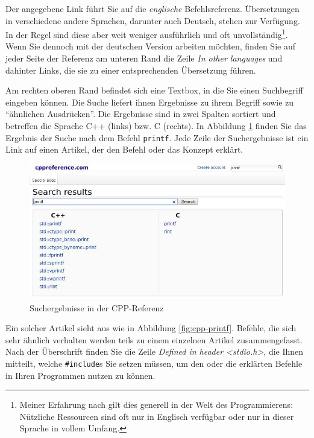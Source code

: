 Der angegebene Link führt Sie auf die \emph{englische} Befehlsreferenz. Übersetzungen in verschiedene andere Sprachen, darunter auch Deutsch, stehen zur Verfügung. In der Regel sind diese aber weit weniger ausführlich und oft unvollständig\footnote{Meiner Erfahrung nach gilt dies generell in der Welt des Programmierens: Nützliche Ressourcen sind oft nur in Englisch verfügbar oder nur in dieser Sprache in vollem Umfang.}. Wenn Sie dennoch mit der deutschen Version arbeiten möchten, finden Sie auf jeder Seite der Referenz am unteren Rand die Zeile \emph{In other languages} und dahinter Links, die sie zu einer entsprechenden Übersetzung führen.

Am rechten oberen Rand befindet sich eine Textbox, in die Sie einen Suchbegriff eingeben können. Die Suche liefert ihnen Ergebnisse zu ihrem Begriff sowie zu \enquote{ähnlichen Ausdrücken}. Die Ergebnisse sind in zwei Spalten sortiert und betreffen die Sprache C++ (links) bzw. C (rechts). In Abbildung \ref{fig:cpp-search} finden Sie das Ergebnis der Suche nach dem Befehl \texttt{printf}. Jede Zeile der Suchergebnisse ist ein Link auf einen Artikel, der den Befehl oder das Konzept erklärt.

\begin{figure}[h!]
	\includegraphics[width=\linewidth]{./gfx/cpp-search}
	\caption{Suchergebnisse in der CPP-Referenz} \label{fig:cpp-search}
\end{figure}

Ein solcher Artikel sieht \idR aus wie in Abbildung \ref{fig:cpp-printf}. Befehle, die sich sehr ähnlich verhalten werden teils zu einem einzelnen Artikel zusammengefasst. Nach der Überschrift finden Sie die Zeile \emph{Defined in header <stdio.h>}, die Ihnen mitteilt, welche \texttt{#include}s Sie setzen müssen, um den oder die erklärten Befehle in Ihren Programmen nutzen zu können.

